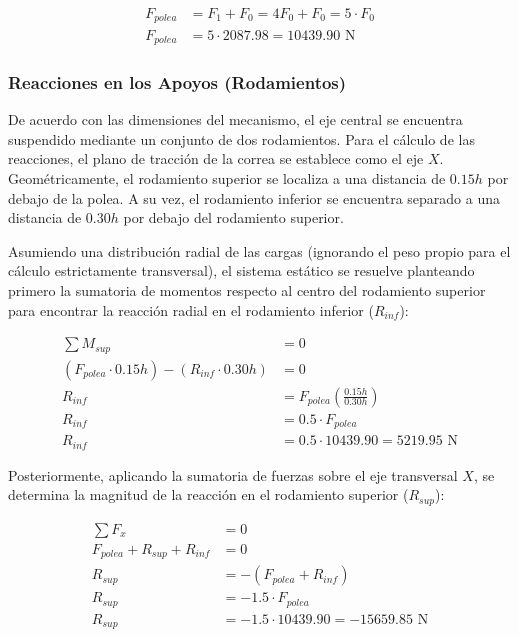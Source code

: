\documentclass[12pt, a4paper]{article}
\begin{document}
\begin{align}
    F_{polea} &= F_1 + F_0 = 4F_0 + F_0 = 5 \cdot F_0 \\[6pt]
    F_{polea} &= 5 \cdot 2087.98 = 10439.90 \text{ N}
\end{align}

\subsubsection{Reacciones en los Apoyos (Rodamientos)}

De acuerdo con las dimensiones del mecanismo, el eje central se encuentra suspendido mediante un conjunto de dos rodamientos. Para el cálculo de las reacciones, el plano de tracción de la correa se establece como el eje $X$. Geométricamente, el rodamiento superior se localiza a una distancia de $0.15h$ por debajo de la polea. A su vez, el rodamiento inferior se encuentra separado a una distancia de $0.30h$ por debajo del rodamiento superior. 

Asumiendo una distribución radial de las cargas (ignorando el peso propio para el cálculo estrictamente transversal), el sistema estático se resuelve planteando primero la sumatoria de momentos respecto al centro del rodamiento superior para encontrar la reacción radial en el rodamiento inferior ($R_{inf}$):

\begin{align}
    \sum M_{sup} &= 0 \nonumber \\[6pt]
    (F_{polea} \cdot 0.15h) - (R_{inf} \cdot 0.30h) &= 0 \nonumber \\[6pt]
    R_{inf} &= F_{polea} \left( \frac{0.15h}{0.30h} \right) \\[6pt]
    R_{inf} &= 0.5 \cdot F_{polea} \\[6pt]
    R_{inf} &= 0.5 \cdot 10439.90 = 5219.95 \text{ N}
\end{align}

Posteriormente, aplicando la sumatoria de fuerzas sobre el eje transversal $X$, se determina la magnitud de la reacción en el rodamiento superior ($R_{sup}$):

\begin{align}
    \sum F_x &= 0 \nonumber \\[6pt]
    F_{polea} + R_{sup} + R_{inf} &= 0 \nonumber \\[6pt]
    R_{sup} &= - \left( F_{polea} + R_{inf} \right) \\[6pt]
    R_{sup} &= - 1.5 \cdot F_{polea} \\[6pt]
    R_{sup} &= - 1.5 \cdot 10439.90 = -15659.85 \text{ N}
\end{align}
\end{document}
